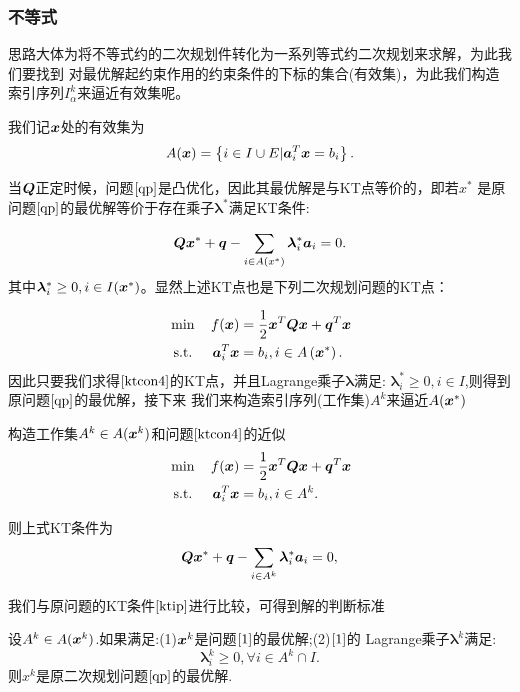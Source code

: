 \documentclass[12pt,oneside,a4paper]{article}
\begin{document}
\subsubsection{不等式}
思路大体为将不等式约的二次规划件转化为一系列等式约二次规划来求解，为此我们要找到
对最优解起约束作用的约束条件的下标的集合(有效集)，为此我们构造索引序列$I^k_{\alpha}$来逼近有效集呢。

我们记${\boldsymbol x}$处的有效集为
\begin{equation*}
A({\boldsymbol x})=\left\{i \in I \cup E | {\boldsymbol a}_{i}^{T} {\boldsymbol x}=b_{i}\right\}.
\end{equation*}

当${\boldsymbol Q}$正定时候，问题$\ref{qp}$是凸优化，因此其最优解是与KT点等价的，即若$x^*$
是原问题$\ref{qp}$的最优解等价于存在乘子$\boldsymbol{\lambda}^*$满足KT条件:

\begin{equation}\label{ktip}
{\boldsymbol Q} {\boldsymbol x}^{*}+{\boldsymbol q}-\sum_{i \in A\left(x^{*}\right)} \boldsymbol{\lambda}_{i}^{*} {\boldsymbol a}_{i}=0.
\end{equation}
其中$\boldsymbol{\lambda}_i^* \geq 0,i \in I({\boldsymbol x}^*)$。显然上述KT点也是下列二次规划问题的KT点：

\begin{align}\label{ktcon4}
&\min \quad f({\boldsymbol x})=\frac{1}{2} {\boldsymbol x}^{T} {\boldsymbol Q} {\boldsymbol x}+{\boldsymbol q}^{T} {\boldsymbol x}\\
&\text { s.t. } \quad {\boldsymbol a}_{i}^{T} {\boldsymbol x}=b_{i}, i \in A\left({\boldsymbol x}^{*}\right).
\end{align}
因此只要我们求得$\ref{ktcon4}$的KT点，并且Lagrange乘子$\boldsymbol{\lambda}$满足:
$\boldsymbol{\lambda}_i^* \geq 0,i \in I$,则得到原问题$\ref{qp}$的最优解，接下来
我们来构造索引序列(工作集)$A^k$来逼近$A({\boldsymbol x}^*)$

构造工作集$A^k \in A({\boldsymbol x}^k)$和问题$\ref{ktcon4}$的近似
\begin{align}\label{2}
&\min \quad f({\boldsymbol x})=\frac{1}{2} {\boldsymbol x}^{T} {\boldsymbol Q} {\boldsymbol x}+{\boldsymbol q}^{T} {\boldsymbol x}\\
&\text { s.t. } \quad {\boldsymbol a}_{i}^{T} {\boldsymbol x}=b_{i}, i \in A^k.
\end{align}

则上式KT条件为
\begin{equation}\label{1}
{\boldsymbol Q} {\boldsymbol x}^{*}+{\boldsymbol q}-\sum_{i \in A^k} \boldsymbol{\lambda}_{i}^{*} {\boldsymbol a}_{i}=0,
\end{equation}

我们与原问题的KT条件$\ref{ktip}$进行比较，可得到解的判断标准

\begin{theorem}\label{t1}
设$A^k \in A({\boldsymbol x}^k)$.如果满足:(1)${\boldsymbol x}^k$是问题$\ref{1}$的最优解;(2)$\ref{1}$的
Lagrange乘子$\boldsymbol{\lambda}^k$满足:$$\boldsymbol{\lambda}_i^k \geq 0 ,\forall i \in A^k \cap I.$$
则$x^k$是原二次规划问题$\ref{qp}$的最优解.
\end{theorem}
\end{document}
